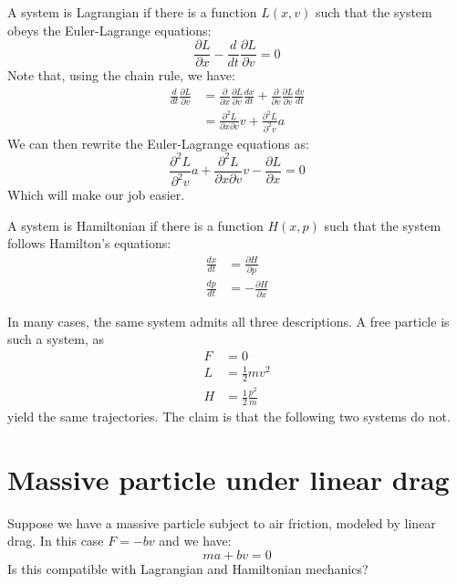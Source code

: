 \documentclass[11pt]{article}
\begin{document}
A system is Lagrangian if there is a function $L(x,v)$ such that the system obeys the Euler-Lagrange equations:
\begin{equation}
\label{EulerLagrange}
\frac{\partial L}{\partial x} - \frac{d}{dt} \frac{\partial L}{\partial v} = 0
\end{equation}
Note that, using the chain rule, we have:
\begin{align*}
\frac{d}{dt} \frac{\partial L}{\partial v} &= \frac{\partial}{\partial x} \frac{\partial L}{\partial v} \frac{dx}{dt} + \frac{\partial}{\partial v}  \frac{\partial L}{\partial v} \frac{dv}{dt} \\
&= \frac{\partial^2 L}{\partial x \partial v} v + \frac{\partial^2 L}{\partial^2 v} a
\end{align*}
We can then rewrite the Euler-Lagrange equations as:
\begin{equation}
\label{EulerLagrangeMod}
\frac{\partial^2 L}{\partial^2 v} a + \frac{\partial^2 L}{\partial x \partial v} v - \frac{\partial L}{\partial x}=0
\end{equation}
Which will make our job easier.

A system is Hamiltonian if there is a function $H(x,p)$ such that the system follows Hamilton's equations:
\begin{equation}
\begin{aligned}
\frac{dx}{dt} &= \frac{\partial H}{\partial p} \\
\frac{dp}{dt} &= - \frac{\partial H}{\partial x}
\end{aligned}
\label{Hamilton}
\end{equation}

In many cases, the same system admits all three descriptions. A free particle is such a system, as
\begin{equation}
\begin{aligned}
F&=0 \\
L&=\frac{1}{2}mv^2 \\
H&=\frac{1}{2}\frac{p^2}{m}
\end{aligned}
\end{equation}
yield the same trajectories. The claim is that the following two systems do not.

\section{Massive particle under linear drag}

Suppose we have a massive particle subject to air friction, modeled by linear drag. In this case $F=-bv$ and we have:
\begin{equation}
\label{dragEq}
ma+bv=0
\end{equation}
Is this compatible with Lagrangian and Hamiltonian mechanics?
\end{document}
